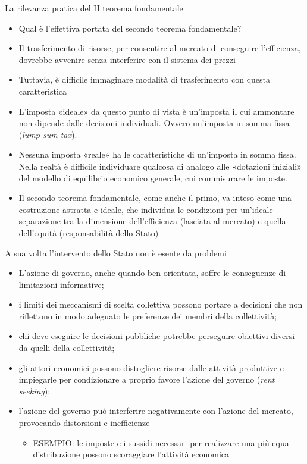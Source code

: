 \documentclass[aspectratio=64,11pt]{beamer}
\begin{document}
\begin{frame}{La rilevanza pratica del II teorema fondamentale}
\begin{itemize}
\item Qual è l’effettiva portata del secondo teorema fondamentale?
\item Il trasferimento di risorse, per consentire al mercato di conseguire
l’efficienza, dovrebbe avvenire senza interferire con il sistema dei prezzi
\item Tuttavia, è difficile immaginare modalità di trasferimento con questa caratteristica
\item L’imposta «ideale» da questo punto di vista è un’imposta il cui ammontare
non dipende dalle decisioni individuali. Ovvero un’imposta in somma fissa
(\emph{lump sum tax}).
\item Nessuna imposta «reale» ha le caratteristiche di un’imposta in somma
fissa. Nella realtà è difficile individuare qualcosa di analogo alle
«dotazioni iniziali» del modello di equilibrio economico generale, cui
commisurare le imposte.
\item Il secondo teorema fondamentale, come anche il primo, va inteso come una
\alert{costruzione astratta e ideale}, che individua le condizioni per un’ideale
separazione tra la dimensione dell’efficienza (lasciata al mercato) e quella
dell’equità (responsabilità dello Stato)
\end{itemize}
\end{frame}

\begin{frame}{A sua volta l'intervento dello Stato non è esente da problemi}
\begin{itemize}
\item L'azione di governo, anche quando ben orientata, soffre le conseguenze di
limitazioni informative;
\item i limiti dei meccanismi di scelta collettiva possono portare a decisioni che
non riflettono in modo adeguato le preferenze dei membri della collettività;
\item chi deve eseguire le decisioni pubbliche potrebbe perseguire obiettivi
diversi da quelli della collettività;
\item gli attori economici possono distogliere risorse dalle attività produttive e
impiegarle per condizionare a proprio favore l’azione del governo (\emph{rent
seeking});
\item l'azione del governo può interferire negativamente con l'azione del mercato,
provocando distorsioni e inefficienze
\begin{itemize}
\item ESEMPIO: le imposte e i sussidi necessari per realizzare una più equa
distribuzione possono scoraggiare l'attività economica
\end{itemize}
\end{itemize}
\end{frame}
\end{document}
